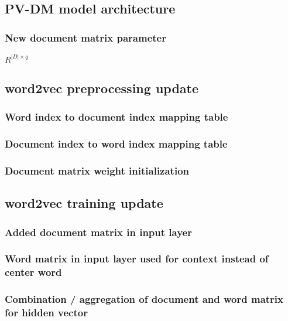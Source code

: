 \documentclass[a4paper]{article}
\begin{document}
\subsection{PV-DM model architecture}


\subsubsection{New document matrix parameter}

$R^{\vert D \vert \times  q}$

\subsection{word2vec preprocessing update}

\subsubsection{Word index to document index mapping table}

\subsubsection{Document index to word index mapping table}

\subsubsection{Document matrix weight initialization}

\subsection{word2vec training update}

\subsubsection{Added document matrix in input layer}

\subsubsection{Word matrix in input layer used for context instead of center word}

\subsubsection{Combination / aggregation of document and word matrix for hidden vector}
\end{document}
